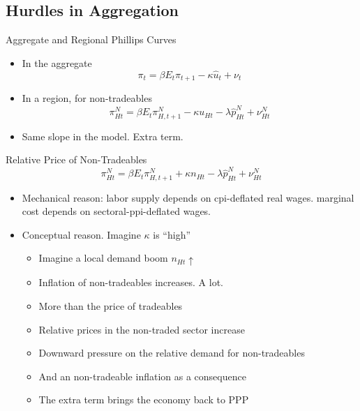 \documentclass[english,xcolor=svgnames]{beamer}
\begin{document}
\subsection{Hurdles in Aggregation}

\begin{frame}{Aggregate and Regional Phillips Curves}
\begin{itemize}
\item In the aggregate
	\[ \pi_{t} = \beta E_{t} \pi_{t+1} - \kappa \hat{u}_{t}  + \nu_{t} \] \vspace{-10pt}
\item In a region, for non-tradeables
		\[\pi^N_{Ht}=\beta E_{t}\pi^N_{H,t+1} - \kappa u_{Ht}  - \lambda \hat{p}^N_{Ht} + \nu^N_{Ht} \]
\item Same slope in the model. Extra term.
\end{itemize}
\end{frame}


\begin{frame}{Relative Price of Non-Tradeables}
		\[\pi^N_{Ht}=\beta E_{t}\pi^N_{H,t+1} + \kappa n_{Ht}  - \lambda \hat{p}^N_{Ht} + \nu^N_{Ht} \]
\begin{itemize}
\item Mechanical reason: labor supply depends on cpi-deflated real wages. marginal cost depends on sectoral-ppi-deflated wages.
\item Conceptual reason. Imagine $\kappa$ is ``high''
\begin{itemize}
\item Imagine a local demand boom $n_{Ht} \uparrow$
\item Inflation of non-tradeables increases. A lot.
\item More than the price of tradeables
\item Relative prices in the non-traded sector increase
\item Downward pressure on the relative demand for non-tradeables
\item And an non-tradeable inflation as a consequence
\item The extra term brings the economy back to PPP
\end{itemize}
\end{itemize}
\end{frame}
\end{document}
